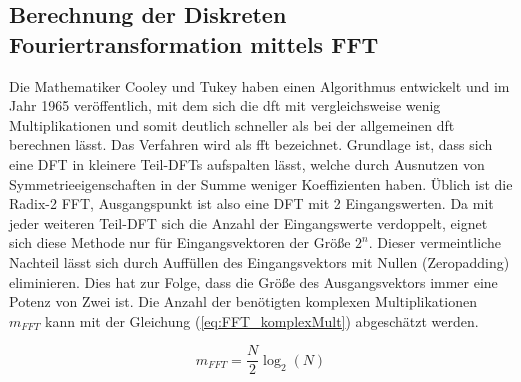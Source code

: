 \subsection{Berechnung der Diskreten Fouriertransformation mittels FFT}\label{sec:BerechnungFFT}
Die Mathematiker Cooley und Tukey haben einen Algorithmus entwickelt und im Jahr 1965 veröffentlich, mit dem sich die \gls{dft} mit vergleichsweise wenig Multiplikationen
und somit deutlich schneller als bei der allgemeinen \gls{dft} berechnen lässt. Das Verfahren wird als \gls{fft} bezeichnet.
Grundlage ist, dass sich eine DFT
in kleinere Teil-DFTs aufspalten lässt, welche durch Ausnutzen von Symmetrieeigenschaften in der Summe weniger Koeffizienten haben. 
Üblich ist die Radix-2 FFT, Ausgangspunkt ist also eine DFT mit 2 Eingangswerten.
Da mit jeder weiteren Teil-DFT sich die Anzahl der Eingangswerte verdoppelt, eignet sich diese Methode nur für Eingangsvektoren der Größe $2^n$. Dieser
vermeintliche Nachteil lässt sich durch Auffüllen des Eingangsvektors mit Nullen (Zeropadding) eliminieren. Dies hat zur Folge, dass die Größe des Ausgangsvektors
immer eine Potenz von Zwei ist. 
Die Anzahl der benötigten komplexen Multiplikationen $m_{FFT}$ kann mit der Gleichung (\ref{eq:FFT_komplexMult}) abgeschätzt werden.


\begin{equation}\label{eq:FFT_komplexMult}
 m_{FFT} = \frac{N}{2}\log_2(N)
\end{equation}









